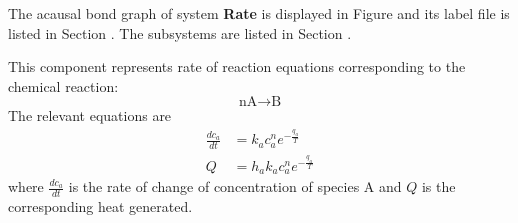 

   The acausal bond graph of system \textbf{Rate} is
   displayed in Figure  and its label
   file is listed in Section .
   The subsystems are listed in Section .


This component represents rate of reaction equations corresponding to
the chemical reaction:
\begin{equation}
  \text{nA} \rightarrow \text{B}
\end{equation}
The relevant equations are
\begin{equation}
  \begin{align}
     \frac{dc_a}{dt} &= k_a c_a^n e^{-\frac{q_a}{T}} \tag{Rate of reaction}\\
     Q &= h_a k_a c_a^n e^{-\frac{q_a}{T}} \tag{Heat of reaction}
  \end{align}
\end{equation}
where $\frac{dc_a}{dt}$ is the rate of change of concentration of
species A and $Q$ is the corresponding heat generated.

